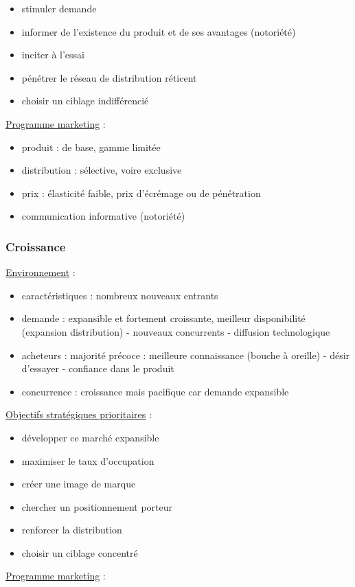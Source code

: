 			\begin{itemize}
				\item stimuler demande
				\item informer de l'existence du produit et de ses avantages (notoriété)
				\item inciter à l'essai
				\item pénétrer le réseau de distribution réticent
				\item choisir un ciblage indifférencié
			\end{itemize}
			\n
			\underline{Programme marketing} :
			
			\begin{itemize}
				\item produit : de base, gamme limitée
				\item distribution : sélective, voire exclusive
				\item prix : élasticité faible, prix d'écrémage ou de pénétration
				\item communication informative (notoriété)
			\end{itemize}
			
			
			\subsubsection{Croissance}
			
			\underline{Environnement} :
		
			\begin{itemize}
				\item caractéristiques : nombreux nouveaux entrants
				\item demande : expansible et fortement croissante, meilleur disponibilité (expansion distribution) - nouveaux concurrents - diffusion technologique
				\item acheteurs : majorité précoce : meilleure connaissance (bouche à oreille) - désir d'essayer - confiance dans le produit
				\item concurrence : croissance mais pacifique car demande expansible
			\end{itemize}
			\n
			\underline{Objectifs stratégiques prioritaires} :
			
			\begin{itemize}
				\item développer ce marché expansible
				\item maximiser le taux d'occupation
				\item créer une image de marque
				\item chercher un positionnement porteur
				\item renforcer la distribution
				\item choisir un ciblage concentré
			\end{itemize}
		\n
			\underline{Programme marketing} :
			

